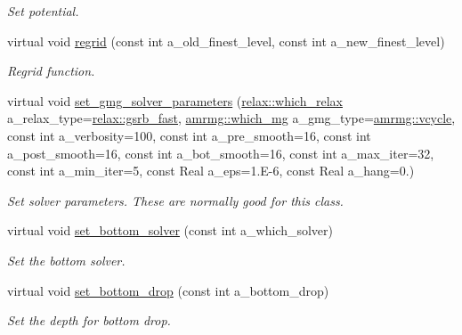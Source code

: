 \begin{DoxyCompactItemize}
\begin{DoxyCompactList}\small\item\em Set potential. \end{DoxyCompactList}\item 
virtual void \hyperlink{classpoisson__multifluid__gmg_a8a4979fa474d3342b558fed04df368ab}{regrid} (const int a\+\_\+old\+\_\+finest\+\_\+level, const int a\+\_\+new\+\_\+finest\+\_\+level)
\begin{DoxyCompactList}\small\item\em Regrid function. \end{DoxyCompactList}\item 
virtual void \hyperlink{classpoisson__multifluid__gmg_a4119ff9b255dd8c8e393c2bd8d88bbd6}{set\+\_\+gmg\+\_\+solver\+\_\+parameters} (\hyperlink{namespacerelax_a1b017edf55c06d103aa5b61e015fe219}{relax\+::which\+\_\+relax} a\+\_\+relax\+\_\+type=\hyperlink{namespacerelax_a1b017edf55c06d103aa5b61e015fe219a9f7cf3af97cc2038d3aceba1dbd02c7b}{relax\+::gsrb\+\_\+fast}, \hyperlink{namespaceamrmg_aa3e75c1253c968e52106305f762a7952}{amrmg\+::which\+\_\+mg} a\+\_\+gmg\+\_\+type=\hyperlink{namespaceamrmg_aa3e75c1253c968e52106305f762a7952abcef3ebc4ac4f095d5cf0e2e2b35c23e}{amrmg\+::vcycle}, const int a\+\_\+verbosity=100, const int a\+\_\+pre\+\_\+smooth=16, const int a\+\_\+post\+\_\+smooth=16, const int a\+\_\+bot\+\_\+smooth=16, const int a\+\_\+max\+\_\+iter=32, const int a\+\_\+min\+\_\+iter=5, const Real a\+\_\+eps=1.E-\/6, const Real a\+\_\+hang=0.)
\begin{DoxyCompactList}\small\item\em Set solver parameters. These are normally good for this class. \end{DoxyCompactList}\item 
virtual void \hyperlink{classpoisson__multifluid__gmg_a2e73a94dbe16d5fef304fac62457d6fd}{set\+\_\+bottom\+\_\+solver} (const int a\+\_\+which\+\_\+solver)
\begin{DoxyCompactList}\small\item\em Set the bottom solver. \end{DoxyCompactList}\item 
virtual void \hyperlink{classpoisson__multifluid__gmg_af155d38ce7a9d371d5c4186863e0073f}{set\+\_\+bottom\+\_\+drop} (const int a\+\_\+bottom\+\_\+drop)
\begin{DoxyCompactList}\small\item\em Set the depth for bottom drop. \end{DoxyCompactList}\item 

\end{DoxyCompactItemize}
